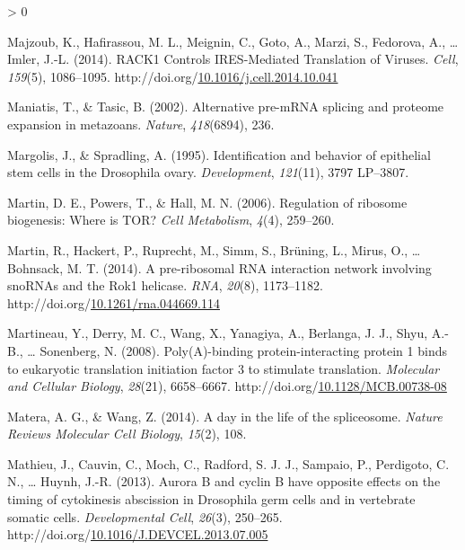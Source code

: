 \documentclass[12pt,oneside]{reedthesis}
\newlength{\cslhangindent}
\newenvironment{CSLReferences}[2] %
 {%
  \setlength{\parindent}{0pt}
  \ifodd #1 \everypar{\setlength{\hangindent}{\cslhangindent}}\ignorespaces\fi
  \ifnum #2 > 0
  \setlength{\parskip}{#2\baselineskip}
  \fi
 }%
 {}
\begin{document}
\begin{CSLReferences}{1}{0}
\leavevmode\hypertarget{ref-majzoubRACK1ControlsIRESMediated2014}{}%
Majzoub, K., Hafirassou, M. L., Meignin, C., Goto, A., Marzi, S., Fedorova, A., \ldots{} Imler, J.-L. (2014). {RACK1 Controls IRES-Mediated Translation} of {Viruses}. \emph{Cell}, \emph{159}(5), 1086--1095. http://doi.org/\href{https://doi.org/10.1016/j.cell.2014.10.041}{10.1016/j.cell.2014.10.041}

\leavevmode\hypertarget{ref-Maniatis2002}{}%
Maniatis, T., \& Tasic, B. (2002). Alternative pre-{mRNA} splicing and proteome expansion in metazoans. \emph{Nature}, \emph{418}(6894), 236.

\leavevmode\hypertarget{ref-Margolis1995a}{}%
Margolis, J., \& Spradling, A. (1995). Identification and behavior of epithelial stem cells in the {Drosophila} ovary. \emph{Development}, \emph{121}(11), 3797 LP--3807.

\leavevmode\hypertarget{ref-Martin2006a}{}%
Martin, D. E., Powers, T., \& Hall, M. N. (2006). Regulation of ribosome biogenesis: Where is {TOR}? \emph{Cell Metabolism}, \emph{4}(4), 259--260.

\leavevmode\hypertarget{ref-martinPreribosomalRNAInteraction2014}{}%
Martin, R., Hackert, P., Ruprecht, M., Simm, S., Brüning, L., Mirus, O., \ldots{} Bohnsack, M. T. (2014). A pre-ribosomal {RNA} interaction network involving {snoRNAs} and the {Rok1} helicase. \emph{RNA}, \emph{20}(8), 1173--1182. http://doi.org/\href{https://doi.org/10.1261/rna.044669.114}{10.1261/rna.044669.114}

\leavevmode\hypertarget{ref-Martineau2008c}{}%
Martineau, Y., Derry, M. C., Wang, X., Yanagiya, A., Berlanga, J. J., Shyu, A.-B., \ldots{} Sonenberg, N. (2008). Poly({A})-binding protein-interacting protein 1 binds to eukaryotic translation initiation factor 3 to stimulate translation. \emph{Molecular and Cellular Biology}, \emph{28}(21), 6658--6667. http://doi.org/\href{https://doi.org/10.1128/MCB.00738-08}{10.1128/MCB.00738-08}

\leavevmode\hypertarget{ref-Matera2014}{}%
Matera, A. G., \& Wang, Z. (2014). A day in the life of the spliceosome. \emph{Nature Reviews Molecular Cell Biology}, \emph{15}(2), 108.

\leavevmode\hypertarget{ref-Mathieu2013d}{}%
Mathieu, J., Cauvin, C., Moch, C., Radford, S. J. J., Sampaio, P., Perdigoto, C. N., \ldots{} Huynh, J.-R. (2013). Aurora {B} and cyclin {B} have opposite effects on the timing of cytokinesis abscission in {Drosophila} germ cells and in vertebrate somatic cells. \emph{Developmental Cell}, \emph{26}(3), 250--265. http://doi.org/\href{https://doi.org/10.1016/J.DEVCEL.2013.07.005}{10.1016/J.DEVCEL.2013.07.005}


\end{CSLReferences}
\end{document}
